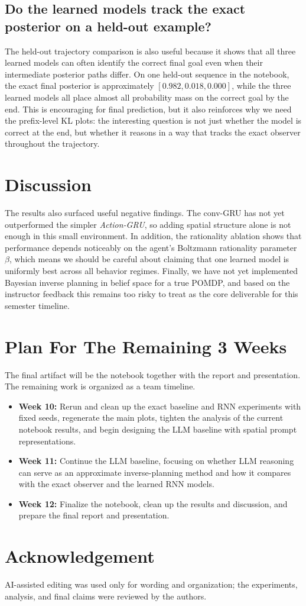 \documentclass[11pt]{article}
\begin{document}
\subsection{Do the learned models track the exact posterior on a held-out example?}
The held-out trajectory comparison is also useful because it shows that all
three learned models can often identify the correct final goal even when their
intermediate posterior paths differ. On one held-out sequence in the notebook,
the exact final posterior is approximately $[0.982, 0.018, 0.000]$, while the
three learned models all place almost all probability mass on the correct goal
by the end. This is encouraging for final prediction, but it also reinforces
why we need the prefix-level KL plots: the interesting question is not just
whether the model is correct at the end, but whether it reasons in a way that
tracks the exact observer throughout the trajectory.

\section{Discussion}
The results also surfaced useful negative findings. The conv-GRU has not yet
outperformed the simpler \textit{Action-GRU}, so adding spatial structure alone
is not enough in this small environment. In addition, the
rationality ablation shows that performance depends noticeably on the agent's
Boltzmann rationality parameter $\beta$, which means we should be careful about
claiming that one learned model is uniformly best across all behavior regimes.
Finally, we have not yet implemented Bayesian inverse planning in belief space
for a true POMDP, and based on the instructor feedback this remains too risky
to treat as the core deliverable for this semester timeline.

\section{Plan For The Remaining 3 Weeks}
The final artifact will be the notebook together with the report and
presentation. The remaining work is organized as a team timeline.

\begin{itemize}[leftmargin=1.5em]
  \item \textbf{Week 10:} Rerun and clean up the exact baseline and RNN
  experiments with fixed seeds, regenerate the main plots, tighten the
  analysis of the current notebook results, and begin designing the LLM
  baseline with spatial prompt representations.
  \item \textbf{Week 11:} Continue the LLM baseline, focusing on whether LLM
  reasoning can serve as an approximate inverse-planning method and how it
  compares with the exact observer and the learned RNN models.
  \item \textbf{Week 12:} Finalize the notebook, clean up the results and
  discussion, and prepare the final report and presentation.
\end{itemize}

\section*{Acknowledgement}
AI-assisted editing was used only for wording and organization; the experiments, analysis, and final claims were reviewed by the authors.
\end{document}

